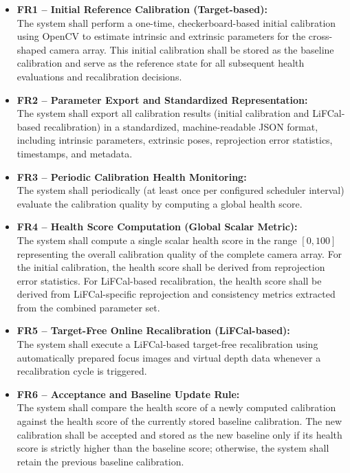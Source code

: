 \documentclass[12pt]{scrartcl}
\begin{document}
\begin{itemize}

  \item \textbf{FR1 – Initial Reference Calibration (Target-based):} \\
  The system shall perform a one-time, checkerboard-based initial calibration using OpenCV
  to estimate intrinsic and extrinsic parameters for the cross-shaped camera array.
  This initial calibration shall be stored as the baseline calibration and serve as
  the reference state for all subsequent health evaluations and recalibration decisions.

  \item \textbf{FR2 – Parameter Export and Standardized Representation:} \\
  The system shall export all calibration results (initial calibration and LiFCal-based recalibration)
  in a standardized, machine-readable JSON format, including intrinsic parameters,
  extrinsic poses, reprojection error statistics, timestamps, and metadata.

  \item \textbf{FR3 – Periodic Calibration Health Monitoring:} \\
  The system shall periodically (at least once per configured scheduler interval) evaluate the calibration quality by computing a global health score.

  \item \textbf{FR4 – Health Score Computation (Global Scalar Metric):} \\
  The system shall compute a single scalar health score in the range $[0,100]$
  representing the overall calibration quality of the complete camera array.
  For the initial calibration, the health score shall be derived from
  reprojection error statistics.
  For LiFCal-based recalibration, the health score shall be derived from
  LiFCal-specific reprojection and consistency metrics extracted from the combined parameter set.

  \item \textbf{FR5 – Target-Free Online Recalibration (LiFCal-based):} \\
  The system shall execute a LiFCal-based target-free recalibration using automatically prepared focus images and virtual depth data whenever a recalibration cycle is triggered.

  \item \textbf{FR6 – Acceptance and Baseline Update Rule:} \\
  The system shall compare the health score of a newly computed calibration
  against the health score of the currently stored baseline calibration.
  The new calibration shall be accepted and stored as the new baseline
  only if its health score is strictly higher than the baseline score;
  otherwise, the system shall retain the previous baseline calibration.


\end{itemize}
\end{document}
